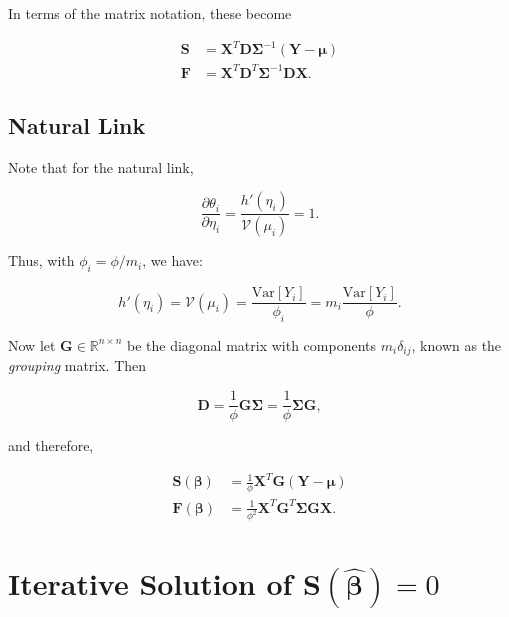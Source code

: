 \documentclass[
  12pt,
]{book}
\begin{document}
In terms of the matrix notation, these become

\begin{align}
  \boldsymbol{S} & = \boldsymbol{X}^{T}\boldsymbol{D}\boldsymbol{\Sigma}^{-1}(\boldsymbol{Y} - \boldsymbol{\mu}) \\
  \boldsymbol{F} & = \boldsymbol{X}^{T}\boldsymbol{D}^{T}\boldsymbol{\Sigma}^{-1}\boldsymbol{D}\boldsymbol{X}.
\end{align}

\subsection{Natural Link}\label{natural-link}

Note that for the natural link,

\begin{equation}
  \frac{\partial \theta_{i}}{\partial \eta_{i}} 
  = \frac{h'(\eta_{i})}{\mathcal{V}(\mu_{i})} 
  = 1.
\end{equation}

Thus, with \(\phi_{i} = \phi/m_{i}\), we have:

\begin{equation}
  h'(\eta_{i}) 
  = \mathcal{V}(\mu_{i})
  = \frac{\text{Var}[Y_{i}] }{ \phi_{i}}
  = m_{i}\frac{{\mathrm{Var}}[Y_{i}] }{ \phi}.
\end{equation}

Now let \(\boldsymbol{G} \in {\mathbb R}^{n \times n}\) be the diagonal matrix with components \(m_{i}\delta_{ij}\), known as the \emph{grouping} matrix. Then

\begin{equation}
  \boldsymbol{D}
  = \frac{1}{\phi} \boldsymbol{G}\boldsymbol{\Sigma}
  = \frac{1}{\phi}\boldsymbol{\Sigma} \boldsymbol{G},
\end{equation}

and therefore,

\begin{align}
  \boldsymbol{S}(\boldsymbol{\beta}) & = \frac{1}{\phi} \boldsymbol{X}^{T}\boldsymbol{G}(\boldsymbol{Y} - \boldsymbol{\mu}) \\
  \boldsymbol{F}(\boldsymbol{\beta}) & = \frac{1}{\phi^{2}} \boldsymbol{X}^{T}\boldsymbol{G}^{T}\boldsymbol{\Sigma}\boldsymbol{G}\boldsymbol{X}.
\end{align}

\section{\texorpdfstring{Iterative Solution of \(\boldsymbol{S}(\hat{\boldsymbol{\beta}}) = 0\)}{Iterative Solution of \textbackslash boldsymbol\{S\}(\textbackslash hat\{\textbackslash boldsymbol\{\textbackslash beta\}\}) = 0}}\label{iterativesolution}
\end{document}
